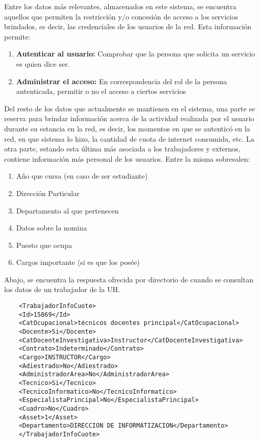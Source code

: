 Entre los datos m\'as relevantes, almacenados en este sistema, se encuentra aquellos que permiten la restricci\'on y/o concesi\'on de acceso a los servicios brindados, es decir, las credenciales de los usuarios de la red. Esta informaci\'on permite:

\begin{enumerate}
\item {\bf Autenticar al usuario:} Comprobar que la persona que solicita un servicio es quien dice ser. 
\item {\bf Administrar el acceso:} En correspondencia del rol de la persona autenticada, permitir o no el acceso a ciertos servicios
\end{enumerate}

Del resto de los datos que actualmente se mantienen en el sistema, una parte se reserva para brindar informaci\'on acerca de la actividad realizada por el usuario durante su estancia en la red, es decir, los momentos en que se autentic\'o en la red, en que sistema lo hizo, la cantidad de cuota de internet consumida, etc. La otra parte, estando esta \'ultima m\'as asociada a los trabajadores y externos, contiene informaci\'on m\'as personal de los usuarios. Entre la misma sobresalen: 

\begin{enumerate}
	\item Año que cursa (en caso de ser estudiante)
	\item Direcci\'on Particular
	\item Departamento al que pertenecen
	\item Datos sobre la nomina
	\item Puesto que ocupa
	\item Cargos importante (si es que los pos\'ee)
\end{enumerate}

Abajo, se encuentra la respuesta ofrecida por directorio de cuando se consultan los datos de un trabajador de la UH.

\begin{verbatim}
	<TrabajadorInfoCuote>
	<Id>15869</Id>
	<CatOcupacional>técnicos docentes principal</CatOcupacional>
	<Docente>Si</Docente>
	<CatDocenteInvestigativa>Instructor</CatDocenteInvestigativa>
	<Contrato>Indeterminado</Contrato>
	<Cargo>INSTRUCTOR</Cargo>
	<Adiestrado>No</Adiestrado>
	<AdministradorArea>No</AdministradorArea>
	<Tecnico>Si</Tecnico>
	<TecnicoInformatico>No</TecnicoInformatico>
	<EspecialistaPrincipal>No</EspecialistaPrincipal>
	<Cuadro>No</Cuadro>
	<Asset>1</Asset>
	<Departamento>DIRECCION DE INFORMATIZACION</Departamento>
	</TrabajadorInfoCuote>
\end{verbatim}

